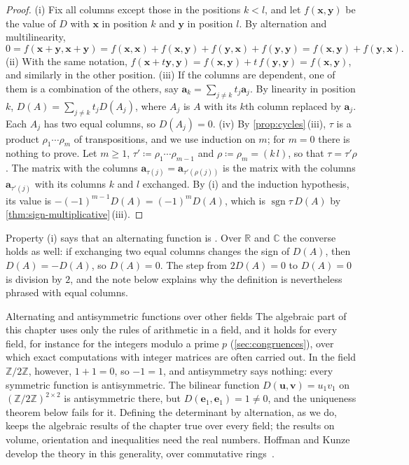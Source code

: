 \begin{proof}
(i) Fix all columns except those in the positions $k<l$, and let $f(\mathbf x,\mathbf y)$ be the value of $D$ with $\mathbf x$ in position $k$ and $\mathbf y$ in position $l$. By alternation and multilinearity,
\[
0=f(\mathbf x+\mathbf y,\mathbf x+\mathbf y)=f(\mathbf x,\mathbf x)+f(\mathbf x,\mathbf y)+f(\mathbf y,\mathbf x)+f(\mathbf y,\mathbf y)=f(\mathbf x,\mathbf y)+f(\mathbf y,\mathbf x).
\]
(ii) With the same notation, $f(\mathbf x+t\mathbf y,\mathbf y)=f(\mathbf x,\mathbf y)+t\,f(\mathbf y,\mathbf y)=f(\mathbf x,\mathbf y)$, and similarly in the other position. (iii) If the columns are dependent, one of them is a combination of the others, say $\mathbf a_k=\sum_{j\ne k}t_j\mathbf a_j$. By linearity in position $k$, $D(A)=\sum_{j\ne k}t_jD(A_j)$, where $A_j$ is $A$ with its $k$th column replaced by $\mathbf a_j$. Each $A_j$ has two equal columns, so $D(A_j)=0$. (iv) By \cref{prop:cycles}\,(iii), $\tau$ is a product $\rho_1\cdots\rho_m$ of transpositions, and we use induction on $m$; for $m=0$ there is nothing to prove. Let $m\ge1$, $\tau'\coloneqq\rho_1\cdots\rho_{m-1}$ and $\rho\coloneqq\rho_m=(k\,l)$, so that $\tau=\tau'\rho$. The matrix with the columns $\mathbf a_{\tau(j)}=\mathbf a_{\tau'(\rho(j))}$ is the matrix with the columns $\mathbf a_{\tau'(j)}$ with its columns $k$ and $l$ exchanged. By (i) and the induction hypothesis, its value is $-(-1)^{m-1}D(A)=(-1)^mD(A)$, which is $\operatorname{sgn}\tau\,D(A)$ by \cref{thm:sign-multiplicative}\,(iii).
\end{proof}

Property (i) says that an alternating function is . Over $\mathbb R$ and $\mathbb C$ the converse holds as well: if exchanging two equal columns changes the sign of $D(A)$, then $D(A)=-D(A)$, so $D(A)=0$. The step from $2D(A)=0$ to $D(A)=0$ is division by $2$, and the note below explains why the definition is nevertheless phrased with equal columns.

\begin{note}{Alternating and antisymmetric functions over other fields}
The algebraic part of this chapter uses only the rules of arithmetic in a field, and it holds for every field, for instance for the integers modulo a prime $p$ (\cref{sec:congruences}), over which exact computations with integer matrices are often carried out. In the field $\mathbb Z/2\mathbb Z$, however, $1+1=0$, so $-1=1$, and antisymmetry says nothing: every symmetric function is antisymmetric. The bilinear function $D(\mathbf u,\mathbf v)=u_1v_1$ on $(\mathbb Z/2\mathbb Z)^{2\times2}$ is antisymmetric there, but $D(\mathbf e_1,\mathbf e_1)=1\ne0$, and the uniqueness theorem below fails for it. Defining the determinant by alternation, as we do, keeps the algebraic results of the chapter true over every field; the results on volume, orientation and inequalities need the real numbers. Hoffman and Kunze develop the theory in this generality, over commutative rings~\cite[Chap.~5]{hoffman1971}.
\end{note}

